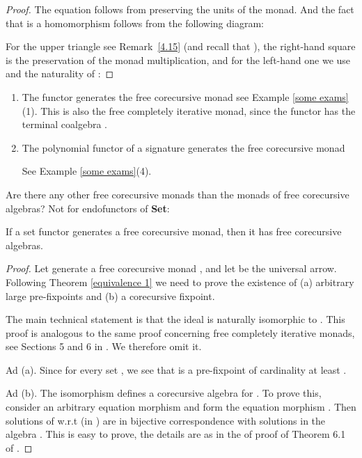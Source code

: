\documentclass{LMCS}
\theoremstyle{plain}
\theoremstyle{definition}
\numberwithin{equation}{section}
\begin{document}
\begin{proof}
 The equation  follows from  preserving the units of the monad. And the fact that  is a homomorphism follows from the following diagram:

For the upper triangle see Remark~\ref{4.15} (and recall that ), the right-hand square is the preservation of the monad multiplication, and for the left-hand one we use  and the naturality of :


\vspace*{-20pt}
\end{proof}

\begin{exa}\hfill
\begin{enumerate}
\item The functor  generates the free corecursive monad   see Example \ref{some exams}(1).
This is also the free completely iterative monad, since the functor  has the terminal coalgebra .

\item The polynomial functor  of a signature  generates the free corecursive monad

 See Example \ref{some exams}(4).
\end{enumerate}
\end{exa}

\noindent Are there any other free corecursive monads than the monads  of free corecursive algebras?
Not for endofunctors of {\bf Set}:

\begin{prop}
If a set functor generates a free corecursive monad, then it has free corecursive algebras.
\end{prop}

\begin{proof}

\sloppypar Let  generate a free corecursive monad , and let  be the universal arrow. Following Theorem \ref{equivalence 1} we need to prove the existence of (a) arbitrary large pre-fixpoints and (b) a corecursive fixpoint.

The main technical statement is that the ideal  is naturally
isomorphic to . This proof is analogous to the same proof
concerning free completely iterative monads, see Sections 5 and 6 in
\cite{aamv}. We therefore omit it.

Ad (a). Since  for every set , we see that  is
a pre-fixpoint of cardinality at least .

Ad (b). The isomorphism 
defines a corecursive algebra for . To prove this, consider an
arbitrary equation morphism  and form the equation
morphism . Then solutions of
 w.r.t  (in ) are in bijective
correspondence with solutions  in the algebra . This is easy
to prove, the details are as in the of proof of Theorem 6.1 of
\cite{m_cia}.
\end{proof}
\end{document}
